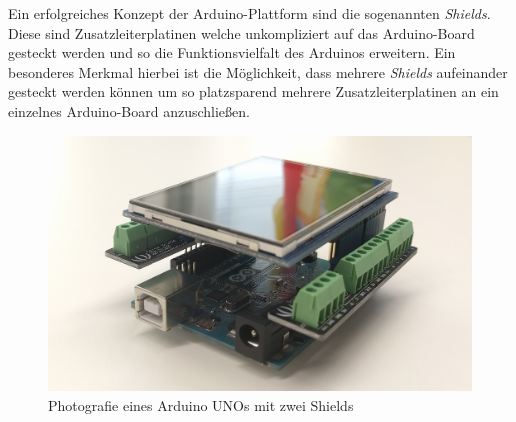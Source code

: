 Ein erfolgreiches Konzept der Arduino-Plattform sind die sogenannten \textit{Shields}.
Diese sind Zusatzleiterplatinen welche unkompliziert auf das Arduino-Board gesteckt werden und so die Funktionsvielfalt des Arduinos erweitern.
Ein besonderes Merkmal hierbei ist die Möglichkeit, dass mehrere \textit{Shields} aufeinander gesteckt werden können um so platzsparend mehrere Zusatzleiterplatinen an ein einzelnes Arduino-Board anzuschließen.
\begin{figure}[H]
	\centering
	\includegraphics[width=12cm]{images/chapter/02/arduino_shields.jpg}
	\caption{Photografie eines Arduino UNOs mit zwei Shields}
	\label{fig:arduino_shield}
\end{figure}
